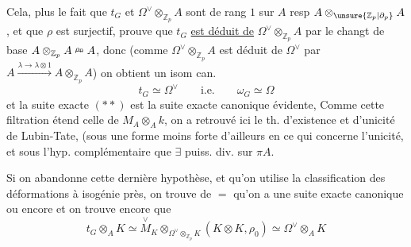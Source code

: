 Cela, plus le fait que $t_G$ et $\Omega^\vee\otimes_{\mathbb Z_p}A$ sont de rang $1$ sur $A$ resp $A\otimes_{\unsure{\mathbb Z_p|\partial_p}}A$, et que $\rho$ est surjectif, prouve que $t_G$ \uline{est déduit de} $\Omega^\vee\otimes_{\mathbb Z_p}A$ par le changt de base $A\otimes_{\mathbb Z_p}A\mathrel{\overset{\rho_0}{\relbar}}A$, donc  (comme $\Omega^\vee\otimes_{\mathbb Z_p}A$ est déduit de $\Omega^\vee$ par $A\xrightarrow{\lambda\to\lambda\otimes 1}A\otimes_{\mathbb Z_p}A$) on obtient un isom can.
\[
t_G\simeq\Omega^\vee\qquad\text{i.e.}\qquad\omega_G\simeq\Omega
\]
et la suite exacte $(**)$ est la suite exacte canonique évidente,  Comme cette filtration étend celle de $M_A\otimes_A k$, on a retrouvé ici le th. d'existence et d'unicité de Lubin-Tate, (sous une forme moins forte d'ailleurs en ce qui concerne l'unicité, et sous l'hyp. complémentaire que $\exists$ puiss. div. sur $\pi A$.

Si on abandonne cette dernière hypothèse, et qu'on utilise la classification des déformations à isogénie près, on trouve de $=$ qu'on a une suite exacte canonique
ou encore
et on trouve encore que
\[
t_G\otimes_A K\simeq\overset{\vee}{M}_K\otimes_{\Omega^\vee\otimes_{\mathbb Z_p}K}(K\otimes K,\rho_0)\simeq\Omega^\vee\otimes_A K
\]
